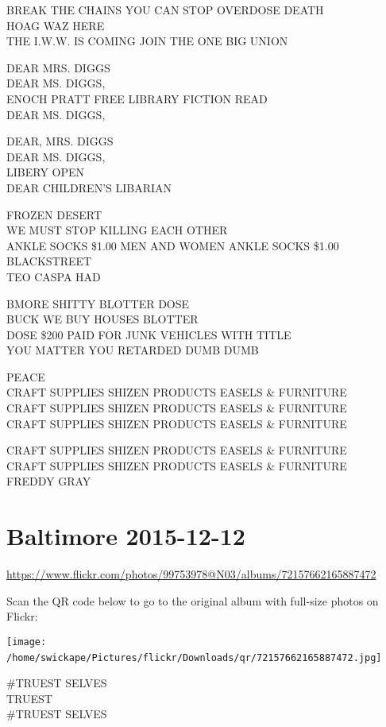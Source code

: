\documentclass[10pt,letterpaper]{article}
\begin{document}
BREAK THE CHAINS YOU CAN STOP OVERDOSE DEATH\\
HOAG WAZ HERE\\
THE I.W.W. IS COMING JOIN THE ONE BIG UNION

DEAR MRS. DIGGS\\
DEAR MS. DIGGS,\\
ENOCH PRATT FREE LIBRARY FICTION READ\\
DEAR MS. DIGGS,

DEAR, MRS. DIGGS\\
DEAR MS. DIGGS,\\
LIBERY OPEN\\
DEAR CHILDREN'S LIBARIAN

FROZEN DESERT\\
WE MUST STOP KILLING EACH OTHER\\
ANKLE SOCKS \$1.00 MEN AND WOMEN ANKLE SOCKS \$1.00 BLACKSTREET\\
TEO CASPA HAD

BMORE SHITTY BLOTTER DOSE\\
BUCK WE BUY HOUSES BLOTTER\\
DOSE \$200 PAID FOR JUNK VEHICLES WITH TITLE\\
YOU MATTER YOU RETARDED DUMB DUMB

PEACE\\
CRAFT SUPPLIES SHIZEN PRODUCTS EASELS \& FURNITURE\\
CRAFT SUPPLIES SHIZEN PRODUCTS EASELS \& FURNITURE\\
CRAFT SUPPLIES SHIZEN PRODUCTS EASELS \& FURNITURE

CRAFT SUPPLIES SHIZEN PRODUCTS EASELS \& FURNITURE\\
CRAFT SUPPLIES SHIZEN PRODUCTS EASELS \& FURNITURE\\
FREDDY GRAY
\

\section*{Baltimore 2015-12-12}

\url{https://www.flickr.com/photos/99753978@N03/albums/72157662165887472}

Scan the QR code below to go to the original album with full-size photos on Flickr:

\texttt{[image: /home/swickape/Pictures/flickr/Downloads/qr/72157662165887472.jpg]}
\

\#TRUEST SELVES\\
TRUEST\\
\#TRUEST SELVES
\end{document}
